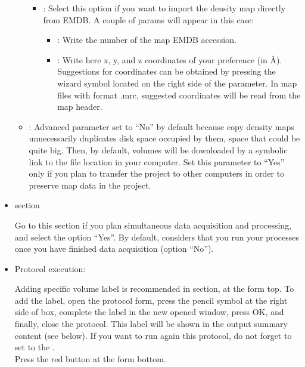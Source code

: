 \begin{itemize}
\begin{itemize}
\begin{itemize}
                    \item {}: Select this option if you want to import the density map directly from EMDB. A couple of params will appear in this case:\\
                                \begin{itemize}
                                \item {}: Write the number of the map EMDB accession.
                                \item {}: Write here x, y, and z coordinates of your preference (in \AA). Suggestions for coordinates can be obtained by pressing the wizard symbol located on the right side of the  parameter. In map files with format .mrc, suggested coordinates will be read from the map header.
                                \end{itemize}
                    \end{itemize}
        \item {}: Advanced parameter set to ``No'' by default because copy density maps unnecessarily duplicates disk space occupied by them, space that could be quite big. Then, by default, volumes will be downloaded by a symbolic link to the file location in your computer. Set this parameter to ``Yes'' only if you plan to transfer the project to other computers in order to preserve map data in the \scipion project.
        \end{itemize}
   
  \item {} section
  
  Go to this section if you plan simultaneous data acquisition and processing, and select the option ``Yes''. By default, \scipion considers that you run your processes once you have finished data acquisition (option ``No'').
  

  \item Protocol execution:
  
  Adding specific volume label is recommended in  section, at the form top. To add the label, open the protocol form, press the pencil symbol at the right side of  box, complete the label in the new opened window, press OK, and finally, close the protocol. This label will be shown in the output summary content (see below). If you want to run again this protocol, do not forget to set to  the .\\
  Press the  red button at the form bottom.
  

\end{itemize}
